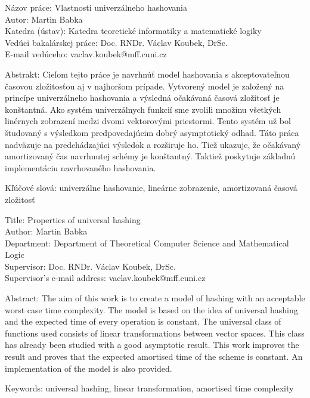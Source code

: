 \noindent
\begin{flushleft}
Názov práce: Vlastnosti univerzálneho hashovania\\
Autor: Martin Babka\\
Katedra (ústav): Katedra teoretické informatiky a matematické logiky\\
Vedúci bakalárskej práce: Doc. RNDr. Václav Koubek, DrSc.\\
E-mail vedúceho: vaclav.koubek@mff.cuni.cz\\

\end{flushleft}
\noindent Abstrakt: Cieľom tejto práce je navrhnúť model hashovania s akceptovateľnou ča\-so\-vou zložitosťou aj v najhoršom prípade. Vytvorený model je založený na princípe univerzálneho hashovania a výsledná očakávaná časová zložitosť je konštantná. Ako systém univerzálnych funkcií sme zvolili množinu všetkých linérnych zobrazení medzi dvomi vektorovými priestormi. Tento systém už bol študovaný s výsledkom predpovedajúcim dobrý asymptotický odhad. Táto práca nadväzuje na predchádzajúci výsledok a rozširuje ho. Tiež ukazuje, že očakávaný amortizovaný čas navrhnutej schémy je konštantný. Taktiež poskytuje základnú implementáciu navrhovaného hashovania.
\begin{flushleft}
\noindent Kľúčové slová: univerzálne hashovanie, lineárne zobrazenie, amortizovaná časová zložitosť

\vspace{10mm}

\noindent
Title: Properties of universal hashing\\
Author: Martin Babka\\
Department: Department of Theoretical Computer Science and Mathematical Logic\\
Supervisor: Doc. RNDr. Václav Koubek, DrSc.\\
Supervisor's e-mail address: vaclav.koubek@mff.cuni.cz\\

\end{flushleft}
\noindent Abstract: The aim of this work is to create a model of hashing with an acceptable worst case time complexity. The model is based on the idea of universal hashing and the expected time of every operation is constant. The universal class of functions used consists of linear transformations between vector spaces. This class has already been studied with a good asymptotic result. This work improves the result and proves that the expected amortised time of the scheme is constant. An implementation of the model is also provided.
\begin{flushleft}
\noindent Keywords: universal hashing, linear transformation, amortised time complexity

\end{flushleft}
\newpage
